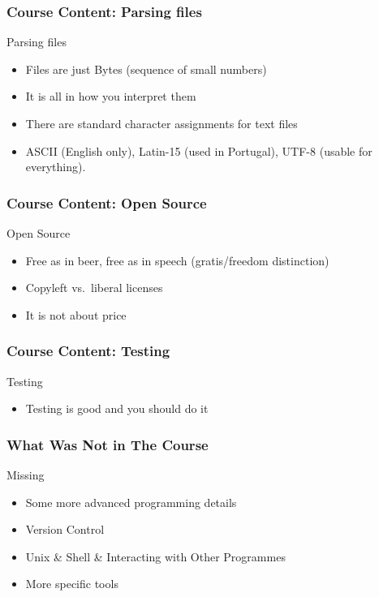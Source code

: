 \begin{frame}[fragile]
\frametitle{Course Content: Parsing files}

\begin{block}{Parsing files}
\begin{itemize}
\item Files are just Bytes (sequence of small numbers)
\item It is all in how you interpret them
\item There are standard character assignments for text files
\item ASCII (English only), Latin-15 (used in Portugal), UTF-8 (usable for everything).
\end{itemize}
\end{block}
\end{frame}


\begin{frame}[fragile]
\frametitle{Course Content: Open Source}
\begin{block}{Open Source}
\begin{itemize}
\item Free as in beer, free as in speech (gratis/freedom distinction)
\item Copyleft vs.\ liberal licenses
\item It is not about price
\end{itemize}
\end{block}
\end{frame}

\begin{frame}[fragile]
\frametitle{Course Content: Testing}
\begin{block}{Testing}
\begin{itemize}
\item Testing is good and you should do it
\end{itemize}
\end{block}
\end{frame}

\begin{frame}[fragile]
\frametitle{What Was Not in The Course}
\begin{block}{Missing}
\begin{itemize}
\item Some more advanced programming details
\item Version Control
\item Unix \& Shell \& Interacting with Other Programmes
\item More specific tools
\end{itemize}
\end{block}

\end{frame}



